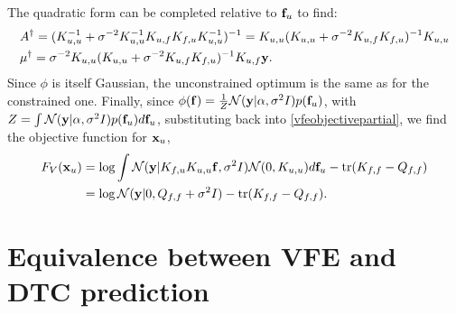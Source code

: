 The quadratic form can be completed relative to ${\mathbf f}_u$ to find:
\begin{equation}
\begin{split}
& A^\dagger = (K_{u,u}^{-1} + \sigma^{-2} K_{u,u}^{-1}K_{u,f}K_{f,u}K_{u,u}^{-1})^{-1} = K_{u,u}(K_{u,u} + \sigma^{-2} K_{u,f}K_{f,u})^{-1} K_{u,u} \\
& \mu^\dagger = \sigma^{-2} K_{u,u} (K_{u,u} + \sigma^{-2} K_{u,f} K_{f,u})^{-1} K_{u,f} {\mathbf y}.
\end{split}
\end{equation}
Since $\phi$ is itself Gaussian, the unconstrained optimum is the same as for the constrained one. Finally, since $\phi({\mathbf f}) = \frac{1}{Z}\mathcal{N}({\mathbf y}|\alpha,\sigma^2 I) p({\mathbf f}_u)$, with $Z = \int \mathcal{N}({\mathbf y}|\alpha,\sigma^2 I) p({\mathbf f}_u) d{\mathbf f}_u$, substituting back into \eqref{vfeobjectivepartial}, we find the objective function for ${\mathbf x}_u$,
\begin{equation}
\begin{split}
 F_V({\mathbf x}_u) & = \log \int \mathcal{N}({\mathbf y}|K_{f,u} K_{u,u} {\mathbf f},\sigma^2 I) \mathcal{N}(0,K_{u,u}) d{\mathbf f}_u - \text{tr}(K_{f,f} - Q_{f,f}) \\
 & = \log \mathcal{N}({\mathbf y}|0,Q_{f,f} + \sigma^2 I) - \text{tr}(K_{f,f} - Q_{f,f}).
 \end{split}
\end{equation}
\section{Equivalence between VFE and DTC prediction}\label{vfeequipsection}

